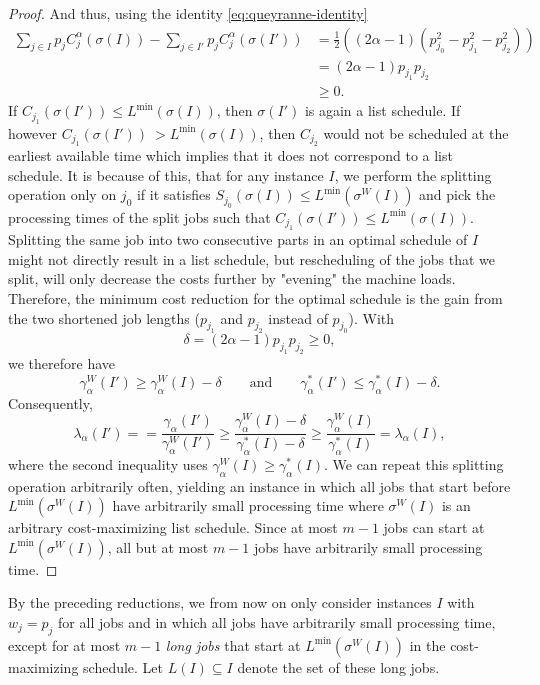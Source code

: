 \documentclass[%
english, titlepage=false %
]{./tum-templates/book/tumbook}
\newcommand{\LamI}{\lambda_{\alpha}(I)}
\newcommand{\OptCost}{\gamma_{\alpha}^{*}(I)}
\newcommand{\WorstCost}{\gamma_{\alpha}^{W}(I)}
\newcommand{\SW}{\sigma^{W}(I)}
\begin{document}
\begin{proof}
And thus, using the identity \eqref{eq:queyranne-identity}
\begin{align*}
        \sum_{j\in I}p_j C^{\alpha}_j(\sigma(I))-\sum_{j\in I'}p_j C^{\alpha}_j(\sigma(I'))
        &=
        \frac12((2\alpha-1)(p_{j_0}^2-p_{j_1}^2-p_{j_2}^2))\\
        &=
        (2\alpha-1)p_{j_1}p_{j_2}\\
        &\ge 0.
\end{align*}
If $C_{j_1}(\sigma(I'))\leq L^{\min}(\sigma(I))$, then 
$\sigma(I')$ is again a list schedule. If however $C_{j_1}(\sigma(I'))\ > L^{\min}(\sigma(I))$, 
then $C_{j_2}$ would not be scheduled at the earliest available time which implies that it does 
not correspond to a list schedule.
It is because of this, that
for any instance $I$, we perform the splitting operation only on $j_0$ if it satisfies
$S_{j_0}(\sigma(I))\leq L^{\min}(\SW)$ and pick the processing times of the split jobs such that $C_{j_1}(\sigma(I'))\leq L^{\min}(\sigma(I))$. 
Splitting the same job into two consecutive parts in an optimal schedule of $I$ might not directly result 
in a list schedule, but rescheduling of the jobs that we split, will only decrease the costs further by "evening" the 
machine loads. Therefore, the minimum cost reduction for the optimal schedule is the gain
from the two shortened job lengths ($p_{j_1}$ and $p_{j_2}$ instead of $p_{j_0}$).
With
\[
\delta=(2\alpha-1)p_{j_1}p_{j_2}\geq0,
\]
we therefore have
\[
\gamma^{W}_{\alpha}(I') \geq\WorstCost-\delta
\qquad\text{and}\qquad
\gamma^{*}_{\alpha}(I')\leq\OptCost-\delta.
\]
Consequently,
\[
\lambda_{\alpha}(I')= = \frac{\gamma_{\alpha}(I')}{\gamma_{\alpha}^W(I')}
\geq
\frac{\WorstCost-\delta}{\OptCost-\delta}
\geq
\frac{\WorstCost}{\OptCost}
=\LamI,
\]
where the second inequality uses $\WorstCost\geq\OptCost$.
We can repeat this splitting operation arbitrarily often, yielding an instance in which all jobs that
start before $L^{\min}(\sigma^{W}(I))$ have arbitrarily small processing time where $\sigma^W(I)$ is an arbitrary cost-maximizing list schedule.
Since at most $m-1$ jobs can start at $L^{\min}(\sigma^{W}(I))$, all but at most
$m-1$ jobs have arbitrarily small processing time.
\end{proof}

By the preceding reductions, we from now on only consider instances $I$
with $w_j=p_j$ for all jobs and in which all jobs have arbitrarily small
processing time, except for at most $m-1$ \emph{long jobs} that start at
$L^{\min}(\sigma^{W}(I))$ in the cost-maximizing schedule. Let $L(I)\subseteq I$ denote the set of these long jobs.
\end{document}

